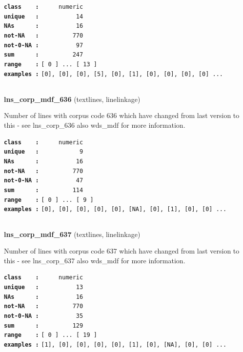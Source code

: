 \documentclass[]{article}
\begin{document}
\textbf{\texttt{class\ \ \ \ :}} \texttt{~~~~~numeric}\\
\textbf{\texttt{unique\ \ \ :}} \texttt{~~~~~~~~~~14}\\
\textbf{\texttt{NAs\ \ \ \ \ \ :}} \texttt{~~~~~~~~~~16}\\
\textbf{\texttt{not-NA\ \ \ :}} \texttt{~~~~~~~~~770}\\
\textbf{\texttt{not-0-NA\ :}} \texttt{~~~~~~~~~~97}\\
\textbf{\texttt{sum\ \ \ \ \ \ :}} \texttt{~~~~~~~~~247}\\
\textbf{\texttt{range\ \ \ \ :}}
\texttt{{[}\ 0\ {]}\ ...\ {[}\ 13\ {]}}\\
\textbf{\texttt{examples\ :}}
\texttt{{[}0{]},\ {[}0{]},\ {[}0{]},\ {[}5{]},\ {[}0{]},\ {[}1{]},\ {[}0{]},\ {[}0{]},\ {[}0{]},\ {[}0{]}\ ...}\\

~

\textbf{lns\_corp\_mdf\_636} (textlines, linelinkage)

Number of lines with corpus code 636 which have changed from last
version to this - see lns\_corp\_636 also wds\_mdf for more information.

\textbf{\texttt{class\ \ \ \ :}} \texttt{~~~~~numeric}\\
\textbf{\texttt{unique\ \ \ :}} \texttt{~~~~~~~~~~~9}\\
\textbf{\texttt{NAs\ \ \ \ \ \ :}} \texttt{~~~~~~~~~~16}\\
\textbf{\texttt{not-NA\ \ \ :}} \texttt{~~~~~~~~~770}\\
\textbf{\texttt{not-0-NA\ :}} \texttt{~~~~~~~~~~47}\\
\textbf{\texttt{sum\ \ \ \ \ \ :}} \texttt{~~~~~~~~~114}\\
\textbf{\texttt{range\ \ \ \ :}}
\texttt{{[}\ 0\ {]}\ ...\ {[}\ 9\ {]}}\\
\textbf{\texttt{examples\ :}}
\texttt{{[}0{]},\ {[}0{]},\ {[}0{]},\ {[}0{]},\ {[}0{]},\ {[}NA{]},\ {[}0{]},\ {[}1{]},\ {[}0{]},\ {[}0{]}\ ...}\\

~

\textbf{lns\_corp\_mdf\_637} (textlines, linelinkage)

Number of lines with corpus code 637 which have changed from last
version to this - see lns\_corp\_637 also wds\_mdf for more information.

\textbf{\texttt{class\ \ \ \ :}} \texttt{~~~~~numeric}\\
\textbf{\texttt{unique\ \ \ :}} \texttt{~~~~~~~~~~13}\\
\textbf{\texttt{NAs\ \ \ \ \ \ :}} \texttt{~~~~~~~~~~16}\\
\textbf{\texttt{not-NA\ \ \ :}} \texttt{~~~~~~~~~770}\\
\textbf{\texttt{not-0-NA\ :}} \texttt{~~~~~~~~~~35}\\
\textbf{\texttt{sum\ \ \ \ \ \ :}} \texttt{~~~~~~~~~129}\\
\textbf{\texttt{range\ \ \ \ :}}
\texttt{{[}\ 0\ {]}\ ...\ {[}\ 19\ {]}}\\
\textbf{\texttt{examples\ :}}
\texttt{{[}1{]},\ {[}0{]},\ {[}0{]},\ {[}0{]},\ {[}0{]},\ {[}1{]},\ {[}0{]},\ {[}NA{]},\ {[}0{]},\ {[}0{]}\ ...}\\
\end{document}
